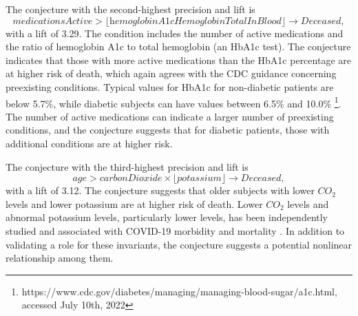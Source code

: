 \documentclass[ijds,nonblindrev]{informs-ijds}
\begin{document}
The conjecture with the second-highest precision and lift is
\[
\textit{medicationsActive} > \lfloor \textit{hemoglobinA1cHemoglobinTotalInBlood} \rfloor \rightarrow \textit{Deceased}, 
\]
with a lift of 3.29.  The condition includes the number of active medications and the ratio of hemoglobin A1c to total hemoglobin (an HbA1c test).   The conjecture indicates that those with more active medications than the HbA1c percentage are at higher risk of death, which again agrees with the CDC guidance concerning preexisting conditions.  Typical values for HbA1c for non-diabetic patients are below 5.7\%, while diabetic subjects can have values between 6.5\% and 10.0\%    \footnote{https://www.cdc.gov/diabetes/managing/managing-blood-sugar/a1c.html, accessed July 10th, 2022}.  The number of active medications can indicate a larger number of preexisting conditions, and the conjecture suggests that for diabetic patients, those with additional conditions are at higher risk.   

The conjecture with the third-highest precision and lift is 
\[
\textit{age} > \textit{carbonDioxide}\times \lfloor \textit{potassium} \rfloor \rightarrow \textit{Deceased},
\]
with a lift of 3.12.  The conjecture suggests that older subjects with lower $CO_2$ levels and lower potassium are at higher risk of death.  Lower $CO_2$ levels and abnormal potassium levels, particularly lower levels, has been independently studied and associated with COVID-19 morbidity and mortality \citep{hu:21,noori:22}.  In addition to validating a role for these invariants, the conjecture suggests a potential nonlinear relationship among them. 

 
\end{document}

